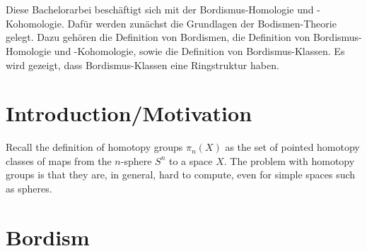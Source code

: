 \documentclass[a4paper,11pt]{article}
\begin{document}
\maketitle
{}
\tableofcontents\newpage

\begin{comment}
\newgeometry{
	left=20mm, %
    top=25mm,
    right=20mm, %
  bmargin=2cm %
}
\end{comment}

\setcounter{section}{-1}

\section*{}
Diese Bachelorarbei besch\"aftigt sich mit der Bordismus-Homologie und -Kohomologie. Daf\"ur werden zun\"achst die Grundlagen der Bodismen-Theorie gelegt. Dazu geh\"oren die Definition von Bordismen, die Definition von Bordismus-Homologie und -Kohomologie, sowie die Definition von Bordismus-Klassen. Es wird gezeigt, dass Bordismus-Klassen eine Ringstruktur haben.

\section{Introduction/Motivation}

Recall the definition of homotopy groups \(\pi_n(X)\) as the set of pointed homotopy classes of maps from the \(n\)-sphere \(S^n\) to a space \(X\). 
The problem with homotopy groups is that they are, in general, hard to compute, even for simple spaces such as spheres.\\



\section{Bordism}
\end{document}
